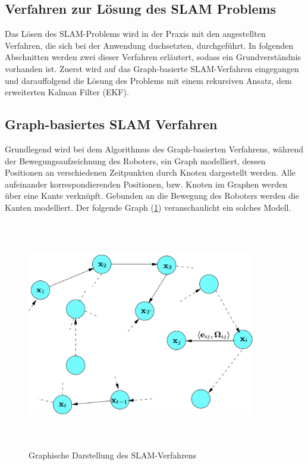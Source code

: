 \subsection{Verfahren zur Lösung des SLAM Problems}
Das Lösen des \acs{SLAM}-Problems wird in der Praxis mit den angestellten Verfahren, die sich bei der Anwendung duchsetzten, durchgeführt. In 
folgenden Abschnitten werden zwei dieser Verfahren erläutert, sodass ein Grundverständnis vorhanden ist. Zuerst wird auf das Graph-basierte 
\acs{SLAM}-Verfahren eingegangen und darauffolgend die Lösung des Problems mit einem rekursiven Ansatz, dem erweiterten Kalman Filter (\acs{EKF}).
\subsection*{Graph-basiertes SLAM Verfahren}
Grundlegend wird bei dem Algorithmus des Graph-basierten Verfahrens, während der Bewegungsaufzeichnung des Roboters, ein Graph modelliert, 
dessen Positionen an verschiedenen Zeitpunkten durch Knoten dargestellt werden. Alle aufeinander korrespondierenden Positionen, bzw. 
Knoten im Graphen werden über eine Kante verknüpft. Gebunden an die Bewegung des Roboters werden die Kanten modelliert. Der folgende Graph 
(\ref{pic:GraphSLAM}) veranschaulicht ein solches Modell.
\begin{figure}[hbt!]
    \centering
    \includegraphics[width=10cm,height=10cm,keepaspectratio]{2Grundlagen/Bilder/graph_SLAM.png}
    \caption{Graphische Darstellung des SLAM-Verfahrens \cite{graphSLAM.2010}}
    \label{pic:GraphSLAM}
\end{figure}
\\ 
